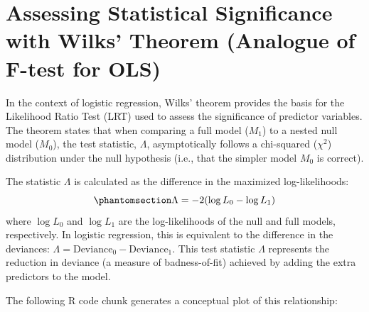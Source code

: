 \documentclass[
  letterpaper,
  DIV=11,
  numbers=noendperiod]{scrreprt}
\begin{document}
\section{Assessing Statistical Significance with Wilks' Theorem
(Analogue of F-test for
OLS)}\label{assessing-statistical-significance-with-wilks-theorem-analogue-of-f-test-for-ols}

In the context of logistic regression, Wilks' theorem provides the basis
for the Likelihood Ratio Test (LRT) used to assess the significance of
predictor variables. The theorem states that when comparing a full model
(\(M_1\)) to a nested null model (\(M_0\)), the test statistic,
\(\Lambda\), asymptotically follows a chi-squared (\(\chi^2\))
distribution under the null hypothesis (i.e., that the simpler model
\(M_0\) is correct).

The statistic \(\Lambda\) is calculated as the difference in the
maximized log-likelihoods:
\begin{equation}\phantomsection\label{eq-LRT}{\Lambda = -2(\log L_0 - \log L_1)}\end{equation}
where \(\log L_0\) and \(\log L_1\) are the log-likelihoods of the null
and full models, respectively. In logistic regression, this is
equivalent to the difference in the deviances:
\(\Lambda = \text{Deviance}_0 - \text{Deviance}_1\). This test statistic
\(\Lambda\) represents the reduction in deviance (a measure of
badness-of-fit) achieved by adding the extra predictors to the model.

The following R code chunk generates a conceptual plot of this
relationship:
\end{document}
